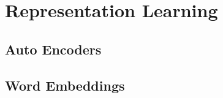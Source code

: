 \section{Representation Learning}
\label{representation_learning}
\subsection{Auto Encoders}
\subsection{Word Embeddings}
\label{wordEmbeddings}